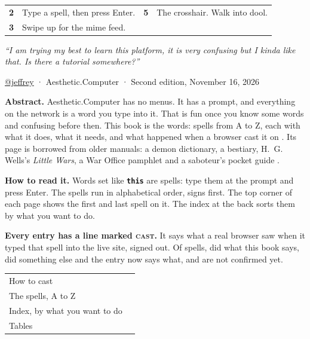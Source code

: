 \documentclass[10pt,twoside]{article}
\newcommand{\acdot}{{\color{acpink}.}}
\newcommand{\ac}{Aesthetic{\acdot}Computer}
\newcommand{\spl}[1]{\texttt{\bfseries #1}}
\begin{document}
\begin{center}
{\begin{tabular}{@{}r@{\ \ }l@{\qquad}r@{\ \ }l@{}}
\textbf{2} & Type a spell, then press Enter. & \textbf{5} & The crosshair. Walk into dool. \\
\textbf{3} & Swipe up for the mime feed. & & \\
\end{tabular}}\par
\vfill
\begin{minipage}{0.78\linewidth}\centering\itshape\color{acdark}
``I am trying my best to learn this platform, it is very confusing but I kinda like that. Is there a tutorial somewhere?''\par
{}
\end{minipage}\par
\vfill
{\small\color{acgray} \href{https://prompt.ac/@jeffrey}{@jeffrey} · \ac{} · Second edition, November 16, 2026}\par
\end{center}
\clearpage
\restoregeometry

\thispagestyle{empty}
\vspace*{0.6em}
\noindent\textbf{Abstract.} \ac{} has no menus. It has a prompt, and everything on the network is a word you type into it. That is fun once you know some words and confusing before then. This book is the words: \spellcount{} spells from A to Z, each with what it does, what it needs, and what happened when a browser cast it on \testdate{}. Its page is borrowed from older manuals: a demon dictionary, a bestiary, H.~G. Wells's \emph{Little Wars}, a War Office pamphlet and a saboteur's pocket guide \citep{platter}.

\vspace{0.7em}
\noindent\textbf{How to read it.} Words set like \spl{this} are spells: type them at the prompt and press Enter. The spells run in alphabetical order, signs first. The top corner of each page shows the first and last spell on it. The index at the back sorts them by what you want to do.

\vspace{0.7em}
\noindent\textbf{Every entry has a line marked \textsc{cast}.} It says what a real browser saw when it typed that spell into the live site, signed out. Of \spellcount{} spells, \tallyworks{} did what this book says, \tallydiffers{} did something else and the entry now says what, and \tallyuntested{} are not confirmed yet.

\vspace{0.9em}
{\small\noindent\begin{tabularx}{\linewidth}{@{}L@{}r@{}}
How to cast & \pageref{ch:cast} \\
The spells, A to Z & \pageref{ch:spells} \\
Index, by what you want to do & \pageref{ch:index} \\
Tables & \pageref{ch:tables} \\
\end{tabularx}}
\clearpage
\end{document}
